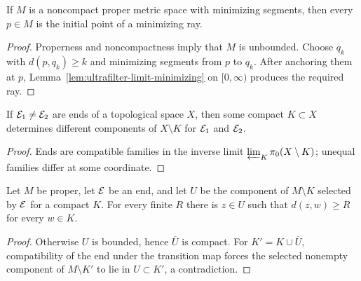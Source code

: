 \begin{lemma}
\label{lem:ray-exists-metric}






If $M$ is a noncompact proper metric space with minimizing segments,
then every $p\in M$ is the initial point of a minimizing ray.
\end{lemma}
\begin{proof}
\sketch

Properness and noncompactness imply that $M$ is unbounded. Choose
$q_k$ with $d(p,q_k)\ge k$ and minimizing segments from $p$ to $q_k$.
After anchoring them at $p$, Lemma~\ref{lem:ultrafilter-limit-minimizing}
on $[0,\infty)$ produces the required ray.
\end{proof}

\begin{lemma}
\label{lem:ends-differ-at-compact}





If $\mathcal{E}_1\ne\mathcal{E}_2$ are ends of a topological space $X$, then some
compact $K\subset X$ determines different components of $X\setminus K$
for $\mathcal{E}_1$ and $\mathcal{E}_2$.
\end{lemma}
\begin{proof}
\sketch

Ends are compatible families in the inverse limit
$\varprojlim_K\pi_0(X\setminus K)$; unequal families differ at some
coordinate.
\end{proof}

\begin{lemma}
\label{lem:end-component-unbounded}






Let $M$ be proper, let $\mathcal{E}$ be an end, and let $U$ be the component of
$M\setminus K$ selected by $\mathcal{E}$ for a compact $K$. For every finite
$R$ there is $z\in U$ such that $d(z,w)\ge R$ for every $w\in K$.
\end{lemma}
\begin{proof}
\sketch

Otherwise $U$ is bounded, hence $\overline U$ is compact. For
$K'=K\cup\overline U$, compatibility of the end under the transition
map forces the selected nonempty component of $M\setminus K'$ to lie in
$U\subset K'$, a contradiction.
\end{proof}


